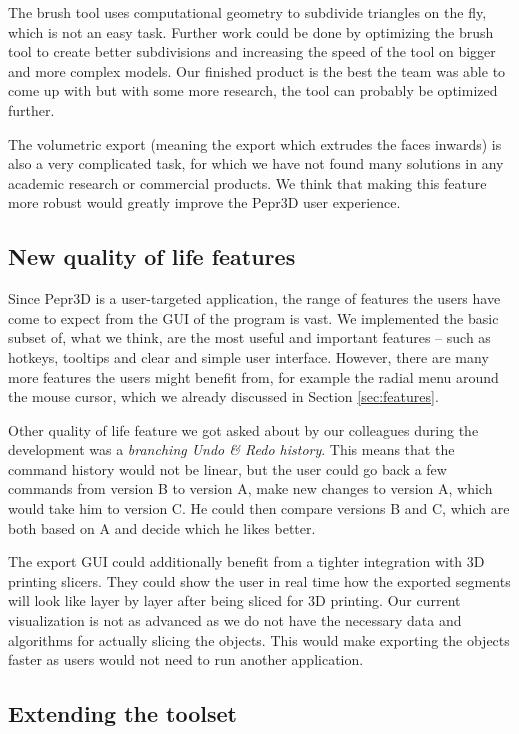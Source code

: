 The brush tool uses computational geometry to subdivide triangles on the fly, which is not an easy task. Further work could be done by optimizing the brush tool to create better subdivisions and increasing the speed of the tool on bigger and more complex models. Our finished product is the best the team was able to come up with but with some more research, the tool can probably be optimized further.

The volumetric export (meaning the export which extrudes the faces inwards) is also a very complicated task, for which we have not found many solutions in any academic research or commercial products. We think that making this feature more robust would greatly improve the Pepr3D user experience.

\subsection{New quality of life features}

Since Pepr3D is a user-targeted application, the range of features the users have come to expect from the GUI of the program is vast. We implemented the basic subset of, what we think, are the most useful and important features -- such as hotkeys, tooltips and clear and simple user interface. However, there are many more features the users might benefit from, for example the radial menu around the mouse cursor, which we already discussed in Section \ref{sec:features}.

Other quality of life feature we got asked about by our colleagues during the development was a \textit{branching Undo \& Redo history}. This means that the command history would not be linear, but the user could go back a few commands from version B to version A, make new changes to version A, which would take him to version C. He could then compare versions B and C, which are both based on A and decide which he likes better.

The export GUI could additionally benefit from a tighter integration with 3D printing slicers. They could show the user in real time how the exported segments will look like layer by layer after being sliced for 3D printing. Our current visualization is not as advanced as we do not have the necessary data and algorithms for actually slicing the objects. This would make exporting the objects faster as users would not need to run another application.

\subsection{Extending the toolset}


